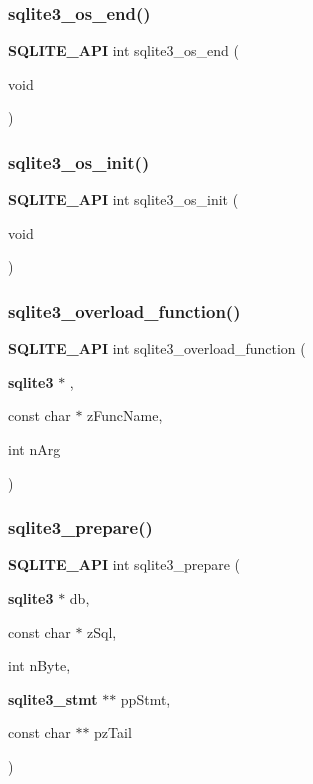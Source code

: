 \subsubsection{sqlite3\_os\_end()}
{\footnotesize\ttfamily \textbf{ S\+Q\+L\+I\+T\+E\+\_\+\+A\+PI} int sqlite3\+\_\+os\+\_\+end (\begin{DoxyParamCaption}\item[{void}]{ }\end{DoxyParamCaption})}

\mbox{\label{sqlite3_8h_acebc2290d00a32d3afe2361f2979038b}} 
\subsubsection{sqlite3\_os\_init()}
{\footnotesize\ttfamily \textbf{ S\+Q\+L\+I\+T\+E\+\_\+\+A\+PI} int sqlite3\+\_\+os\+\_\+init (\begin{DoxyParamCaption}\item[{void}]{ }\end{DoxyParamCaption})}

\mbox{\label{sqlite3_8h_a03692933621e0b16a4a02e1e426cf318}} 
\subsubsection{sqlite3\_overload\_function()}
{\footnotesize\ttfamily \textbf{ S\+Q\+L\+I\+T\+E\+\_\+\+A\+PI} int sqlite3\+\_\+overload\+\_\+function (\begin{DoxyParamCaption}\item[{\textbf{ sqlite3} $\ast$}]{,  }\item[{const char $\ast$}]{z\+Func\+Name,  }\item[{int}]{n\+Arg }\end{DoxyParamCaption})}

\mbox{\label{sqlite3_8h_a8c39e7b9dbeff01f0a399b46d4b29f1c}} 
\subsubsection{sqlite3\_prepare()}
{\footnotesize\ttfamily \textbf{ S\+Q\+L\+I\+T\+E\+\_\+\+A\+PI} int sqlite3\+\_\+prepare (\begin{DoxyParamCaption}\item[{\textbf{ sqlite3} $\ast$}]{db,  }\item[{const char $\ast$}]{z\+Sql,  }\item[{int}]{n\+Byte,  }\item[{\textbf{ sqlite3\+\_\+stmt} $\ast$$\ast$}]{pp\+Stmt,  }\item[{const char $\ast$$\ast$}]{pz\+Tail }\end{DoxyParamCaption})}

